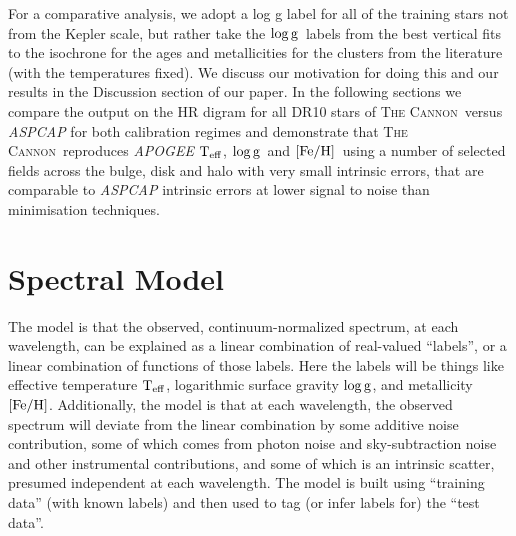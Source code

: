 \documentclass[12pt, preprint]{aastex}
\newcommand{\teff}{\mbox{$\rm T_{eff}$}}
\newcommand{\feh}{\mbox{$\rm [Fe/H]$}}
\newcommand{\logg}{\mbox{$\rm \log g$}}
\newcommand{\tc}{\textsc{The Cannon}}
\begin{document}
For a comparative analysis, we adopt a log g label for all of the training stars not from the Kepler scale, but rather take the \logg\ labels from the best vertical fits to the isochrone for the ages and metallicities for the clusters from the literature (with the temperatures fixed). We discuss our motivation for doing this and our results in the Discussion section of our paper. In the following sections we compare the output on the HR digram for all DR10 stars of \tc\ versus \textit{ASPCAP} for both calibration regimes and demonstrate that \tc\ reproduces \textit{APOGEE} \teff, \logg\ and \feh\ using a number of selected fields across the bulge, disk and halo with very small intrinsic errors, that are comparable to \textit{ASPCAP} intrinsic errors at lower signal to noise than minimisation techniques.



\section{Spectral Model}
\label{sec:spectralmodel}

The model is that the observed, continuum-normalized spectrum, at each
wavelength, can be explained as a linear combination of real-valued
``labels'', or a linear combination of functions of those labels.
Here the labels will be things like effective temperature $\teff$,
logarithmic surface gravity $\logg$, and metallicity $\feh$.
Additionally, the model is that at each wavelength, the observed
spectrum will deviate from the linear combination by some additive
noise contribution, some of which comes from photon noise and
sky-subtraction noise and other instrumental contributions, and some
of which is an intrinsic scatter, presumed independent at each
wavelength.
The model is built using ``training data'' (with known labels) and then
used to tag (or infer labels for) the ``test data''.
\end{document}
